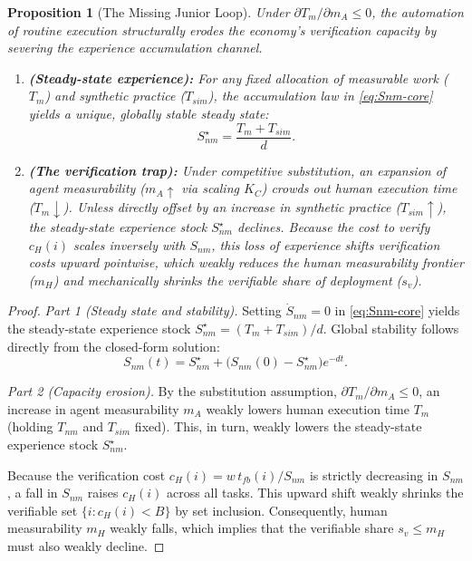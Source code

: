 \documentclass[12pt, letter]{article}
\newtheorem{proposition}{Proposition}
\begin{document}
\begin{proposition}[The Missing Junior Loop]\label{prop:junior-loop-core}
Under $\partial T_m/ \partial m_A \le 0$, the automation of routine execution structurally erodes the economy's verification capacity by severing the experience accumulation channel.
\begin{enumerate}
  \item \textbf{(Steady-state experience):} For any fixed allocation of measurable work ($T_m$) and synthetic practice ($T_{sim}$), the accumulation law in \eqref{eq:Snm-core} yields a unique, globally stable steady state:
  \[
  S^\star_{nm} = \frac{T_m+T_{sim}}{d}.
  \]
  \item \textbf{(The verification trap):} Under competitive substitution, an expansion of agent measurability ($m_A\uparrow$ via scaling $K_C$) crowds out human execution time ($T_m\downarrow$). Unless directly offset by an increase in synthetic practice ($T_{sim}\uparrow$), the steady-state experience stock $S^\star_{nm}$ declines. Because the cost to verify $c_H(i)$ scales inversely with $S_{nm}$, this loss of experience shifts verification costs upward pointwise, which weakly reduces the human measurability frontier ($m_H$) and mechanically shrinks the verifiable share of deployment ($s_v$).
\end{enumerate}
\end{proposition}

\begin{proof}
\textit{Part 1 (Steady state and stability).} Setting $\dot{S}_{nm}=0$ in \eqref{eq:Snm-core} yields the steady-state experience stock $S^\star_{nm} = (T_m+T_{sim})/d$. Global stability follows directly from the closed-form solution:
\[
    S_{nm}(t) = S^\star_{nm} + \big(S_{nm}(0) - S^\star_{nm}\big)e^{-dt}.
\]

\textit{Part 2 (Capacity erosion).} By the substitution assumption, $\partial T_m/ \partial m_A \le 0$, an increase in agent measurability $m_A$ weakly lowers human execution time $T_m$ (holding $T_{nm}$ and $T_{sim}$ fixed). This, in turn, weakly lowers the steady-state experience stock $S^\star_{nm}$.

Because the verification cost $c_H(i) = w\,t_{fb}(i)/S_{nm}$ is strictly decreasing in $S_{nm}$, a fall in $S_{nm}$ raises $c_H(i)$ across all tasks. This upward shift weakly shrinks the verifiable set $\{i : c_H(i) < B\}$ by set inclusion. Consequently, human measurability $m_H$ weakly falls, which implies that the verifiable share $s_v \le m_H$ must also weakly decline.
\end{proof}
\end{document}
